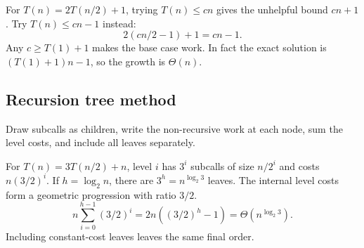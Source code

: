 \documentclass[12pt,a4paper]{article}
\begin{document}
\begin{tcolorbox}[examplebox, title={Strengthening an induction hypothesis}]
For $T(n)=2T(n/2)+1$, trying $T(n)\le cn$ gives the unhelpful bound $cn+1$. Try $T(n)\le cn-1$ instead:
\[
2(cn/2-1)+1=cn-1.
\]
Any $c\ge T(1)+1$ makes the base case work. In fact the exact solution is $(T(1)+1)n-1$, so the growth is $\Theta(n)$.
\end{tcolorbox}

\subsection{Recursion tree method}
Draw subcalls as children, write the non-recursive work at each node, sum the level costs, and include all leaves separately.
\begin{tcolorbox}[tikzbox, title={Recursion tree for two half-size calls}]
\centering
{}\par
\end{tcolorbox}

\begin{tcolorbox}[examplebox, title={A tree dominated by its leaves}]
For $T(n)=3T(n/2)+n$, level $i$ has $3^i$ subcalls of size $n/2^i$ and costs $n(3/2)^i$. If $h=\log_2 n$, there are $3^h=n^{\log_2 3}$ leaves. The internal level costs form a geometric progression with ratio $3/2$.
\[
n\sum_{i=0}^{h-1}(3/2)^i
  =2n\left((3/2)^h-1\right)
  =\Theta(n^{\log_2 3}).
\]
Including constant-cost leaves leaves the same final order.
\end{tcolorbox}
\end{document}
